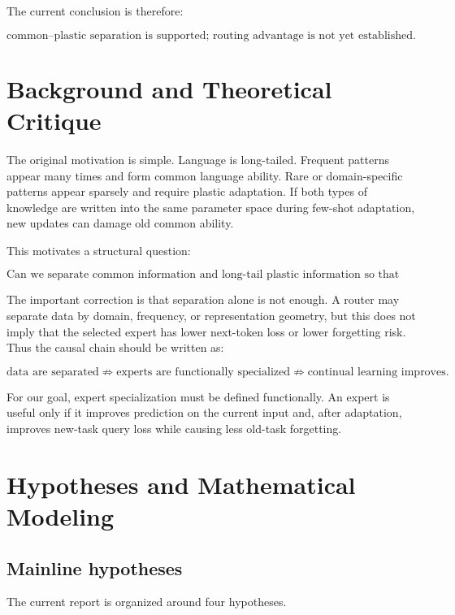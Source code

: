 \documentclass[11pt]{article}
\begin{document}
The current conclusion is therefore:

$$
\text{common--plastic separation is supported; routing advantage is not yet established.}
$$

\section{Background and Theoretical Critique}

The original motivation is simple. Language is long-tailed. Frequent patterns appear many times and form common language ability. Rare or domain-specific patterns appear sparsely and require plastic adaptation. If both types of knowledge are written into the same parameter space during few-shot adaptation, new updates can damage old common ability.

This motivates a structural question:

$$
\text{Can we separate common information and long-tail plastic information so that the model learns new data faster and forgets less?}
$$

The important correction is that separation alone is not enough. A router may separate data by domain, frequency, or representation geometry, but this does not imply that the selected expert has lower next-token loss or lower forgetting risk. Thus the causal chain should be written as:

$$
\text{data are separated}
\not\Rightarrow
\text{experts are functionally specialized}
\not\Rightarrow
\text{continual learning improves.}
$$

For our goal, expert specialization must be defined functionally. An expert is useful only if it improves prediction on the current input and, after adaptation, improves new-task query loss while causing less old-task forgetting.

\section{Hypotheses and Mathematical Modeling}

\subsection{Mainline hypotheses}

The current report is organized around four hypotheses.
\end{document}
